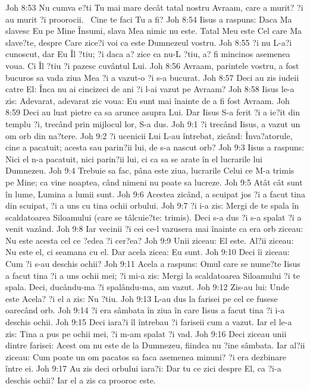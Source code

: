 Joh 8:53  Nu cumva e?ti Tu mai mare decât tatal nostru Avraam, care a murit? ?i au murit ?i proorocii.  Cine te faci Tu a fi?
Joh 8:54  Iisus a raspuns: Daca Ma slavesc Eu pe Mine Însumi, slava Mea nimic nu este. Tatal Meu este Cel care Ma slave?te, despre Care zice?i voi ca este Dumnezeul vostru.
Joh 8:55  ?i nu L-a?i cunoscut, dar Eu Îl ?tiu; ?i daca a? zice ca nu-L ?tiu, a? fi mincinos asemenea voua. Ci Îl ?tiu ?i pazesc cuvântul Lui.
Joh 8:56  Avraam, parintele vostru, a fost bucuros sa vada ziua Mea ?i a vazut-o ?i s-a bucurat.
Joh 8:57  Deci au zis iudeii catre El: Înca nu ai cincizeci de ani ?i l-ai vazut pe Avraam?
Joh 8:58  Iisus le-a zis: Adevarat, adevarat zic voua: Eu sunt mai înainte de a fi fost Avraam.
Joh 8:59  Deci au luat pietre ca sa arunce asupra Lui. Dar Iisus S-a ferit ?i a ie?it din templu ?i, trecând prin mijlocul lor, S-a dus.
Joh 9:1  ?i trecând Iisus, a vazut un om orb din na?tere.
Joh 9:2  ?i ucenicii Lui L-au întrebat, zicând: Înva?atorule, cine a pacatuit; acesta sau parin?ii lui, de s-a nascut orb?
Joh 9:3  Iisus a raspuns: Nici el n-a pacatuit, nici parin?ii lui, ci ca sa se arate în el lucrarile lui Dumnezeu.
Joh 9:4  Trebuie sa fac, pâna este ziua, lucrarile Celui ce M-a trimis pe Mine; ca vine noaptea, când nimeni nu poate sa lucreze.
Joh 9:5  Atât cât sunt în lume, Lumina a lumii sunt.
Joh 9:6  Acestea zicând, a scuipat jos ?i a facut tina din scuipat, ?i a uns cu tina ochii orbului.
Joh 9:7  ?i i-a zis: Mergi de te spala în scaldatoarea Siloamului (care se tâlcuie?te: trimis). Deci s-a dus ?i s-a spalat ?i a venit vazând.
Joh 9:8  Iar vecinii ?i cei ce-l vazusera mai înainte ca era orb ziceau: Nu este acesta cel ce ?edea ?i cer?ea?
Joh 9:9  Unii ziceau: El este. Al?ii ziceau: Nu este el, ci seamana cu el. Dar acela zicea: Eu sunt.
Joh 9:10  Deci îi ziceau: Cum ?i s-au deschis ochii?
Joh 9:11  Acela a raspuns: Omul care se nume?te Iisus a facut tina ?i a uns ochii mei; ?i mi-a zis: Mergi la scaldatoarea Siloamului ?i te spala. Deci, ducându-ma ?i spalându-ma, am vazut.
Joh 9:12  Zis-au lui: Unde este Acela? ?i el a zis: Nu ?tiu.
Joh 9:13  L-au dus la farisei pe cel ce fusese oarecând orb.
Joh 9:14  ?i era sâmbata în ziua în care Iisus a facut tina ?i i-a deschis ochii.
Joh 9:15  Deci iara?i îl întrebau ?i fariseii cum a vazut. Iar el le-a zis: Tina a pus pe ochii mei, ?i m-am spalat ?i vad.
Joh 9:16  Deci ziceau unii dintre farisei: Acest om nu este de la Dumnezeu, fiindca nu ?ine sâmbata. Iar al?ii ziceau: Cum poate un om pacatos sa faca asemenea minuni? ?i era dezbinare între ei.
Joh 9:17  Au zis deci orbului iara?i: Dar tu ce zici despre El, ca ?i-a deschis ochii? Iar el a zis ca prooroc este.
